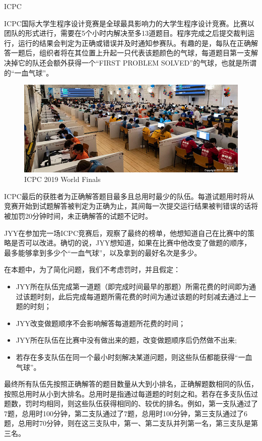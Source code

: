 \begin{Problem}{ICPC}{}

ICPC国际大学生程序设计竞赛是全球最具影响力的大学生程序设计竞赛。比赛以团队的形式进行，需要在5个小时内解决至多13道题目。程序完成之后提交裁判运行，运行的结果会判定为正确或错误并及时通知参赛队。有趣的是，每队在正确解答一题后，组织者将在其位置上升起一只代表该题颜色的气球，每道题目第一支解决掉它的队还会额外获得一个“FIRST PROBLEM SOLVED”的气球，也就是所谓的“一血气球”。

\begin{figure}[h]
\centering
\includegraphics[width=12cm]{src/scoreboard/porto.jpg}
\caption{ICPC 2019 World Finals}
\end{figure}

ICPC最后的获胜者为正确解答题目最多且总用时最少的队伍。每道试题用时将从竞赛开始到试题解答被判定为正确为止，其间每一次提交运行结果被判错误的话将被加罚20分钟时间，未正确解答的试题不记时。

JYY在参加完一场ICPC竞赛后，观察了最终的榜单，他想知道自己在比赛中的策略是否可以改进。确切的说，JYY想知道，如果在比赛中他改变了做题的顺序，最多能够拿到多少个“一血气球”，以及拿到的最好名次是多少。

在本题中，为了简化问题，我们不考虑罚时，并且假定：
\begin{itemize}
\item JYY所在队伍完成第一道题（即完成时间最早的那题）所需花费的时间即为通过该题时刻，此后完成每道题所需花费的时间为通过该题的时刻减去通过上一题的时刻；
\item JYY改变做题顺序不会影响解答每道题所花费的时间；
\item JYY所在队伍在比赛中没有做出来的题，改变做题顺序后仍然做不出来;
\item 若存在多支队伍在同一个最小时刻解决某道问题，则这些队伍都能获得“一血气球”。
\end{itemize}

最终所有队伍先按照正确解答的题目数量从大到小排名，正确解题数相同的队伍，按照总用时从小到大排名。总用时是指通过每道题的时刻之和。若存在多支队伍过题数，罚时均相同，则这些队伍获得相同的、较优的排名。例如，第一支队通过了7题，总用时100分钟，第二支队通过了7题，总用时100分钟，第三支队通过了6题，总用时70分钟，则在这三支队中，第一、第二支队并列第一名，第三支队是第三名。


\end{Problem}
